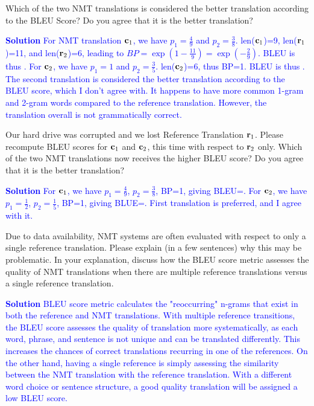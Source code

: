\begin{parts}
\begin{subparts}
        Which of the two NMT translations is considered the better translation according to the BLEU Score? Do you agree that it is the better translation?

        \textcolor{blue}{
            \textbf{Solution} For NMT translation $\mathbf{c}_1$, we have $p_1=\frac{4}{9}$ and $p_2=\frac{3}{8}$. len($\mathbf{c}_1$)=9, len($\mathbf{r}_1$)=11, and len($\mathbf{r}_2$)=6, leading to $BP=\exp(1-\frac{11}{9})=\exp(-\frac{2}{9})$. BLEU is thus . For $\mathbf{c}_2$, we have $p_1=1$ and $p_2=\frac{3}{5}$. len($\mathbf{c}_2$)=6, thus BP=1. BLEU is thus . 
            The second translation is considered the better translation according to the BLEU score, which I don't agree with. It happens to have more common 1-gram and 2-gram words compared to the reference translation. However, the translation overall is not grammatically correct. 
        }
        
        
        \subpart[5] Our hard drive was corrupted and we lost Reference Translation $\mathbf{r}_1$. Please recompute BLEU scores for $\mathbf{c}_1$ and $\mathbf{c}_2$, this time with respect to $\mathbf{r}_2$ only. Which of the two NMT translations now receives the higher BLEU score? Do you agree that it is the better translation?

        \textcolor{blue}{
            \textbf{Solution} For $\mathbf{c}_1$, we have $p_1=\frac{4}{9}$, $p_2=\frac{3}{8}$, BP=1, giving BLEU=. For $\mathbf{c}_2$, we have $p_1=\frac{1}{2}$, $p_2=\frac{1}{5}$, BP=1, giving BLUE=. First translation is preferred, and I agree with it.
        }
        
        
        \subpart[2] Due to data availability, NMT systems are often evaluated with respect to only a single reference translation. Please explain (in a few sentences) why this may be problematic. In your explanation, discuss how the BLEU score metric assesses the quality of NMT translations when there are multiple reference translations versus a single reference translation.
        
        \textcolor{blue}{
            \textbf{Solution} BLEU score metric calculates the "reoccurring" n-grams that exist in both the reference and NMT translations. With multiple reference transitions, the BLEU score assesses the quality of translation more systematically, as each word, phrase, and sentence is not unique and can be translated differently. This increases the chances of correct translations recurring in one of the references. On the other hand, having a single reference is simply assessing the similarity between the NMT translation with the reference translation. With a different word choice or sentence structure, a good quality translation will be assigned a low BLEU score.
        }
        

\end{subparts}
\end{parts}
